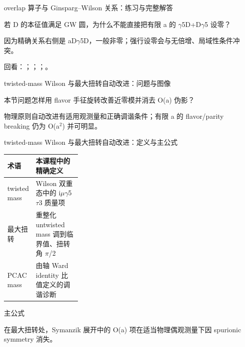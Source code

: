\begin{frame}[t]{overlap 算子与 Ginsparg--Wilson 关系：练习与完整解答}
\footnotesize
\begin{block}{}若 D 的本征值满足 GW 圆，为什么不能直接把有限 a 的 \ensuremath{\gamma}5D+D\ensuremath{\gamma}5 设零？\end{block}
\begin{exampleblock}{}因为精确关系右侧是 aD\ensuremath{\gamma}5D，一般非零；强行设零会与无倍增、局域性条件冲突。\end{exampleblock}
\vfill
\scriptsize 回看：；；；。
\end{frame}

\begin{frame}[t]{twisted-mass Wilson 与最大扭转自动改进：问题与图像}
\footnotesize
\begin{block}{本节问题}怎样用 flavor 手征旋转改善近零模并消去 O(a) 伪影？\end{block}
\begin{block}{物理原则}\quad 自动改进有适用观测量和正确调谐条件；有限 a 的 flavor/\allowbreak{}parity breaking 仍为 O(a\ensuremath{^{2}}) 并可明显。\end{block}
\end{frame}

\begin{frame}[t]{twisted-mass Wilson 与最大扭转自动改进：定义与主公式}
\footnotesize\begin{tabularx}{\linewidth}{p{0.30\linewidth}Y}
\toprule 术语 & 本课程中的精确定义\\\midrule
{} twisted mass & Wilson 双重态中的 i\ensuremath{\mu}\ensuremath{\gamma}5\ensuremath{\tau}3 质量项\\
 最大扭转 & 重整化 untwisted mass 调到临界值、扭转角 \ensuremath{\pi}/\allowbreak{}2\\
 PCAC mass & 由轴 Ward identity 比值定义的调谐诊断\\
\bottomrule\end{tabularx}\vspace{0.15cm}
\begin{block}{ 主公式}\centering{}\end{block}
在最大扭转处，Symanzik 展开中的 O(a) 项在适当物理偶观测量下因 spurionic symmetry 消失。
\end{frame}


